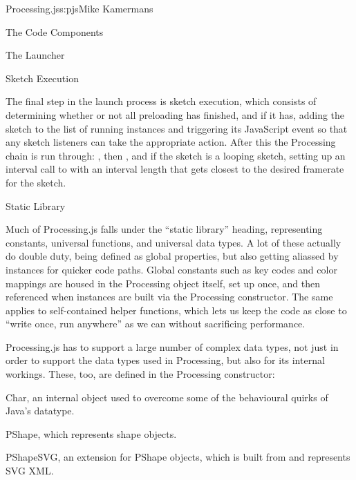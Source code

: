 \begin{aosachapter}{Processing.js}{s:pjs}{Mike Kamermans}
\begin{aosasect1}{The Code Components}
\begin{aosasect2}{The Launcher}
\begin{aosasect3}{Sketch Execution}

The final step in the launch process is sketch execution, which
consists of determining whether or not all preloading has finished,
and if it has, adding the sketch to the list of running instances
and triggering its JavaScript  event so that any sketch
listeners can take the appropriate action. After this the Processing
chain is run through: , then , and if the
sketch is a looping sketch, setting up an interval call to 
with an interval length that gets closest to the desired framerate for
the sketch.

\end{aosasect3}

\end{aosasect2}

\begin{aosasect2}{Static Library}

Much of Processing.js falls under the ``static library'' heading,
representing constants, universal functions, and universal data
types. A lot of these actually do double duty, being defined as global
properties, but also getting aliassed by instances for quicker code
paths. Global constants such as key codes and color mappings are
housed in the Processing object itself, set up once, and then
referenced when instances are built via the Processing
constructor. The same applies to self-contained helper functions,
which lets us keep the code as close to ``write once, run anywhere'' as
we can without sacrificing performance.

Processing.js has to support a large number of complex data types, not
just in order to support the data types used in Processing, but also
for its internal workings. These, too, are defined in the Processing
constructor:

\begin{aosaitemize}


\item Char, an internal object used to overcome some of the
  behavioural quirks of Java's  datatype.

\item PShape, which represents shape objects.

\item PShapeSVG, an extension for PShape objects, which is built from and
  represents SVG XML.


\end{aosaitemize}
\end{aosasect2}
\end{aosasect1}
\end{aosachapter}
